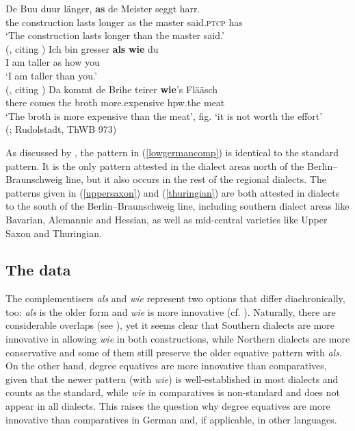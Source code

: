 \ea \label{germancomparatives}
\ea \gll De Buu duur länger, \textbf{as} de Meister seggt harr. \label{lowgermancomp}\\
the construction lasts longer as the master said.\textsc{ptcp} has\\
\glt `The construction lasts longer than the master said.'\\(\citealt[291, ex. 492b]{jaeger2018}, citing \citealt[300]{lindowmoehnniebaumstellmachertaubkenwirrer1998})
\ex \gll Ich bin gresser \textbf{als} \textbf{wie} du \label{uppersaxon}\\
I am taller as how you\\
\glt `I am taller than you.'\\(\citealt[292, ex. 494b]{jaeger2018}, citing \citealt[174]{weise1918})
\ex \gll Da kommt de Brihe teirer \textbf{wie}'s Flääsch \label{thuringian}\\
there comes the broth more.expensive hpw.the meat\\
\glt `The broth is more expensive than the meat', fig. `it is not worth the effort'\\(\citealt[291, ex. 493]{jaeger2018}; Rudolstadt, ThWB 973)
\z
\z

As discussed by \citet{jaeger2018}, the pattern in (\ref{lowgermancomp}) is identical to the standard pattern. It is the only pattern attested in the dialect areas north of the Berlin--Braunschweig line, but it also occurs in the rest of the regional dialects. The patterns given in (\ref{uppersaxon}) and (\ref{thuringian}) are both attested in dialects to the south of the Berlin--Braunschweig line, including southern dialect areas like Bavarian, Alemannic and Hessian, as well as mid-central varieties like Upper Saxon and Thuringian.

\subsection{The data} \label{sec:5data}
The complementisers \textit{als} and \textit{wie} represent two options that differ diachronically, too: \textit{als} is the older form and \textit{wie} is more innovative (cf. \citealt{jaeger2010, jaeger2018}). Naturally, there are considerable overlaps (see \citealt[288--358]{jaeger2018}), yet it seems clear that Southern dialects are more innovative in allowing \textit{wie} in both constructions, while Northern dialects are more conservative and some of them still preserve the older equative pattern with \textit{als}. On the other hand, degree equatives are more innovative than comparatives, given that the newer pattern (with \textit{wie}) is well-established in most dialects and counts as the standard, while \textit{wie} in comparatives is non-standard and does not appear in all dialects. This raises the question why degree equatives are more innovative than comparatives in German and, if applicable, in other languages.

